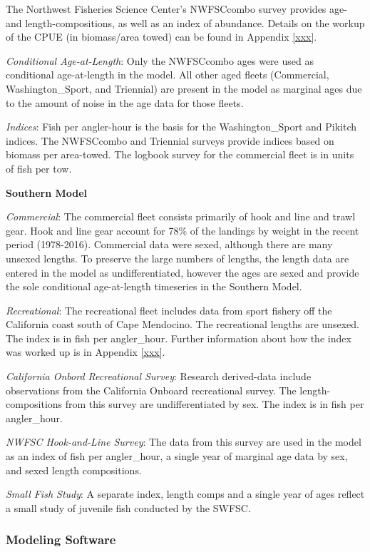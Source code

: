\documentclass[12pt,]{article}
\begin{document}
The Northwest Fisheries Science Center's NWFSCcombo survey provides age-
and length-compositions, as well as an index of abundance. Details on
the workup of the CPUE (in biomass/area towed) can be found in Appendix
\ref{xxx}.

\emph{Conditional Age-at-Length}: Only the NWFSCcombo ages were used as
conditional age-at-length in the model. All other aged fleets
(Commercial, Washington\_Sport, and Triennial) are present in the model
as marginal ages due to the amount of noise in the age data for those
fleets.

\emph{Indices}: Fish per angler-hour is the basis for the
Washington\_Sport and Pikitch indices. The NWFSCcombo and Triennial
surveys provide indices based on biomass per area-towed. The logbook
survey for the commercial fleet is in units of fish per tow.

\textbf{Southern Model}

\emph{Commercial}: The commercial fleet consists primarily of hook and
line and trawl gear. Hook and line gear account for 78\% of the landings
by weight in the recent period (1978-2016). Commercial data were sexed,
although there are many unsexed lengths. To preserve the large numbers
of lengths, the length data are entered in the model as
undifferentiated, however the ages are sexed and provide the sole
conditional age-at-length timeseries in the Southern Model.

\emph{Recreational}: The recreational fleet includes data from sport
fishery off the California coast south of Cape Mendocino. The
recreational lengths are unsexed. The index is in fish per angler\_hour.
Further information about how the index was worked up is in Appendix
\ref{xxx}.

\emph{California Onbord Recreational Survey}: Research derived-data
include observations from the California Onboard recreational survey.
The length-compositions from this survey are undifferentiated by sex.
The index is in fish per angler\_hour.

\emph{NWFSC Hook-and-Line Survey}: The data from this survey are used in
the model as an index of fish per angler\_hour, a single year of
marginal age data by sex, and sexed length compositions.

\emph{Small Fish Study}: A separate index, length comps and a single
year of ages reflect a small study of juvenile fish conducted by the
SWFSC.

\subsubsection{Modeling Software}\label{modeling-software}
\end{document}
